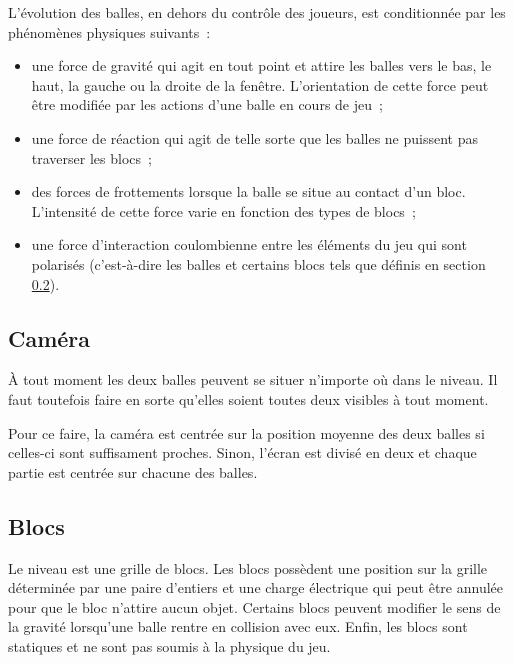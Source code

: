 L'évolution des balles, en dehors du contrôle des joueurs, est
conditionnée par les phénomènes physiques suivants~:

\begin{itemize}
    \item une force de gravité qui agit en tout point et attire
    les balles vers le bas, le haut, la gauche ou la droite de la
    fenêtre. L'orientation de cette force peut être modifiée par les
    actions d'une balle en cours de jeu~;

    \item une force de réaction qui agit de telle sorte
    que les balles ne puissent pas traverser les blocs~;

    \item des forces de frottements lorsque la balle se situe
    au contact d'un bloc. L'intensité de cette force varie
    en fonction des types de blocs~;

    \item une force d'interaction coulombienne entre les éléments
    du jeu qui sont polarisés (c'est-à-dire les balles et
    certains blocs tels que définis en section \ref{section:ptf-blocs}).
\end{itemize}

\subsection{Caméra}

À tout moment les deux balles peuvent se situer n'importe où dans le
niveau. Il faut toutefois faire en sorte qu'elles soient toutes deux
visibles à tout moment.

Pour ce faire, la caméra est centrée sur la position moyenne
des deux balles si celles-ci sont suffisament proches. Sinon,
l'écran est divisé en deux et chaque partie est centrée sur chacune
des balles.

\subsection{Blocs}
\label{section:ptf-blocs}

Le niveau est une grille de blocs. Les blocs possèdent
une position sur la grille déterminée par une paire d'entiers et
une charge électrique qui peut être annulée pour que le bloc
n'attire aucun objet. Certains blocs peuvent modifier le sens
de la gravité lorsqu'une balle rentre en collision avec eux.
Enfin, les blocs sont statiques et ne sont pas soumis
à la physique du jeu.

